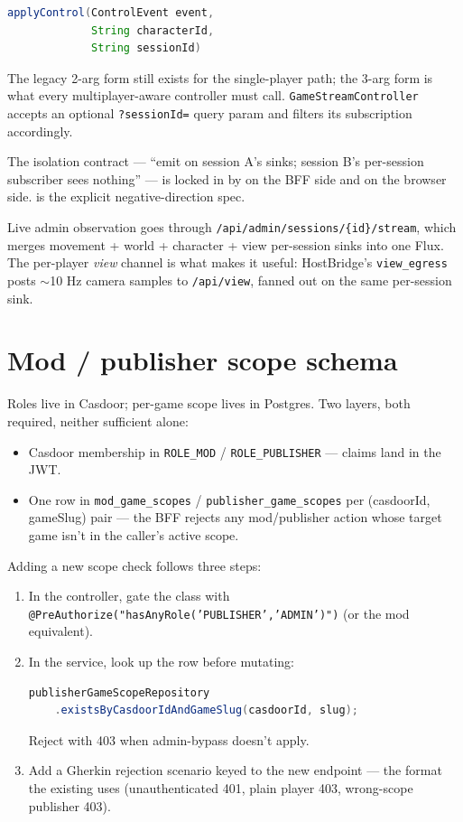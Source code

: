 \documentclass[11pt,a4paper,openany]{book}
\begin{document}
\begin{lstlisting}[language=Java]
applyControl(ControlEvent event,
             String characterId,
             String sessionId)
\end{lstlisting}

The legacy 2-arg form still exists for the single-player path; the
3-arg form is what every multiplayer-aware controller must call.
\texttt{GameStreamController} accepts an optional \texttt{?sessionId=}
query param and filters its subscription accordingly.

The isolation contract --- ``emit on session A's sinks; session B's
per-session subscriber sees nothing'' --- is locked in by
 on the BFF side and
 on the
browser side.  is the
explicit negative-direction spec.

Live admin observation goes through
\texttt{/api/admin/sessions/\{id\}/stream}, which merges movement +
world + character + view per-session sinks into one Flux. The
per-player \emph{view} channel is what makes it useful: HostBridge's
\texttt{view\_egress} posts $\sim$10 Hz camera samples to
\texttt{/api/view}, fanned out on the same per-session sink.

\chapter{Mod / publisher scope schema}
Roles live in Casdoor; per-game scope lives in Postgres. Two layers,
both required, neither sufficient alone:

\begin{itemize}
  \item Casdoor membership in \texttt{ROLE\_MOD} /
        \texttt{ROLE\_PUBLISHER} --- claims land in the JWT.
  \item One row in \texttt{mod\_game\_scopes} /
        \texttt{publisher\_game\_scopes} per (casdoorId, gameSlug)
        pair --- the BFF rejects any mod/publisher action whose
        target game isn't in the caller's active scope.
\end{itemize}

Adding a new scope check follows three steps:

\begin{enumerate}
  \item In the controller, gate the class with
        \texttt{@PreAuthorize("hasAnyRole('PUBLISHER','ADMIN')")} (or
        the mod equivalent).
  \item In the service, look up the row before mutating:
\begin{lstlisting}[language=Java,xleftmargin=4mm]
publisherGameScopeRepository
    .existsByCasdoorIdAndGameSlug(casdoorId, slug);
\end{lstlisting}
        Reject with 403 when admin-bypass doesn't apply.
  \item Add a Gherkin rejection scenario keyed to the new endpoint
        --- the format the existing
        uses (unauthenticated 401, plain player 403,
        wrong-scope publisher 403).
\end{enumerate}
\end{document}
